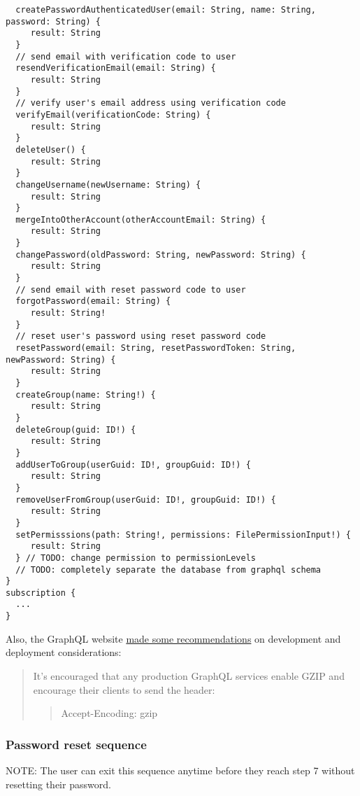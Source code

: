 \begin{verbatim}
  createPasswordAuthenticatedUser(email: String, name: String, password: String) {
     result: String
  }
  // send email with verification code to user
  resendVerificationEmail(email: String) {
     result: String
  }
  // verify user's email address using verification code
  verifyEmail(verificationCode: String) {
     result: String
  }
  deleteUser() {
     result: String
  }
  changeUsername(newUsername: String) {
     result: String
  }
  mergeIntoOtherAccount(otherAccountEmail: String) {
     result: String
  }
  changePassword(oldPassword: String, newPassword: String) {
     result: String
  }
  // send email with reset password code to user
  forgotPassword(email: String) {
     result: String!
  }
  // reset user's password using reset password code
  resetPassword(email: String, resetPasswordToken: String, newPassword: String) {
     result: String
  }
  createGroup(name: String!) {
     result: String
  }
  deleteGroup(guid: ID!) {
     result: String
  }
  addUserToGroup(userGuid: ID!, groupGuid: ID!) {
     result: String
  }
  removeUserFromGroup(userGuid: ID!, groupGuid: ID!) {
     result: String
  }
  setPermisssions(path: String!, permissions: FilePermissionInput!) {
     result: String
  } // TODO: change permission to permissionLevels
  // TODO: completely separate the database from graphql schema
}
subscription {
  ...
}
\end{verbatim}

Also, the GraphQL website
\href{https://graphql.org/learn/best-practices/}{made some
recommendations} on development and deployment considerations:

\begin{quote}
It's encouraged that any production GraphQL services enable GZIP and
encourage their clients to send the header:

\begin{quote}
Accept-Encoding: gzip
\end{quote}
\end{quote}

\hypertarget{password-reset-sequence}{%
\subsubsection{Password reset sequence}\label{password-reset-sequence}}

NOTE: The user can exit this sequence anytime before they reach step 7
without resetting their password.

